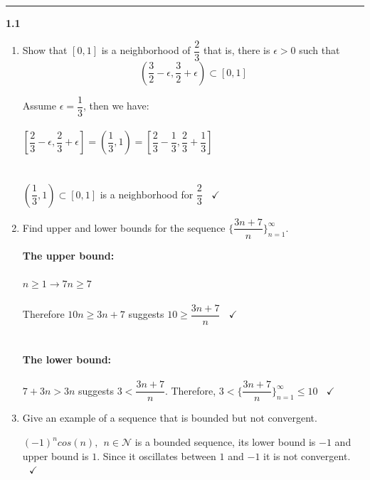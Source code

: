 \documentclass[fleqn]{article}
\begin{document}
  \rule{15cm}{2pt}

  \textbf{1.1}
  \begin{enumerate}
    \item Show that $[0, 1]$ is a neighborhood of $\dfrac{2}{3}$ that is, there is $\epsilon > 0$ such that
    $$
      \left(\dfrac{3}{2}-\epsilon, \dfrac{3}{2}+\epsilon\right) \subset [0,1]
    $$

      \textcolor{hwColor}{
        Assume $\epsilon=\dfrac{1}{3}$, then we have:
        \\
        \\
        $
          \left[\dfrac{2}{3}-\epsilon, \dfrac{2}{3}+\epsilon\right]=\left(\dfrac{1}{3}, 1\right)=\left[\dfrac{2}{3}-\dfrac{1}{3}, \dfrac{2}{3}+\dfrac{1}{3}\right]
        $
        \\
        \\
        \\
        $
          \left(\dfrac{1}{3}, 1\right) \subset \left[0,1\right]
        $ is a neighborhood for $\dfrac{2}{3} ~~~~ \checkmark$  
      }

    \item Find upper and lower bounds for the sequence $\{\dfrac{3n+7}{n}\}_{n=1}^{\infty}$.

      \textcolor{hwColor}{
        \textbf{The upper bound:}
        \\
        \\
        $
          n \geq 1\longrightarrow 7n \geq 7 
        $
        \\
        \\
        Therefore $10n \geq 3n+7$ suggests $10 \geq \dfrac{3n+7}{n} ~~~~ \checkmark$
        \\
        \\
        \\
        \textbf{The lower bound:}
        \\
        \\
        $7+3n >3n$ suggests $3<\dfrac{3n+7}{n}$. Therefore, $3<\{\dfrac{3n+7}{n}\}_{n=1}^{\infty} \leq 10 ~~~~ \checkmark$
      }

    \item Give an example of a sequence that is bounded but not convergent.
    
      \textcolor{hwColor}{
        $(-1)^n cos(n), ~~ n \in \mathcal{N}$ is a bounded sequence, its lower bound is $-1$ and upper 
        bound is $1$. Since it oscillates between $1$ and $-1$ it is not convergent. $~~~ \checkmark$
      }


\end{enumerate}
\end{document}
